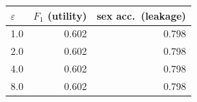 \begin{tabular}{lrr}
\toprule
$\varepsilon$ & $F_1$ (utility) & sex acc.\ (leakage) \\
\midrule
1.0 & 0.602 & 0.798 \\
2.0 & 0.602 & 0.798 \\
4.0 & 0.602 & 0.798 \\
8.0 & 0.602 & 0.798 \\
\bottomrule
\end{tabular}
